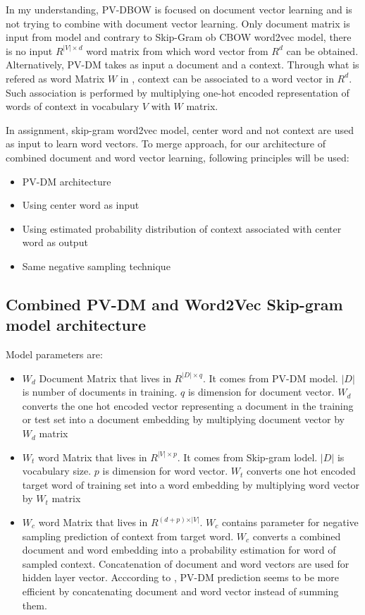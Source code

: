 \documentclass[a4paper]{article}
\begin{document}
In my understanding, PV-DBOW is focused on document vector learning and is not trying to combine with document vector learning. Only document matrix is input from model and contrary to Skip-Gram ob CBOW word2vec model, there is no input $R^{\vert V \vert \times d}$ word matrix from which word vector from $R^{d}$ can be obtained.\\

Alternatively, PV-DM takes as input a document and a context. Through what is refered as word Matrix $W$ in \cite{quocLe2014doc2vec}, context can be associated to a word vector in $R^{d}$. Such association is performed by multiplying one-hot encoded representation of words of context in vocabulary $V$ with $W$ matrix.

In assignment, skip-gram word2vec model, center word and not context are used as input to learn word vectors. To merge approach, for our architecture of combined document and word vector learning, following principles will be used:
\begin{itemize}
\item PV-DM architecture
\item Using center word as input
\item Using estimated probability distribution of context associated with center word as output
\item Same negative sampling technique
\end{itemize}


\subsection{Combined PV-DM and Word2Vec Skip-gram model architecture}

Model parameters are:

\begin{itemize}
\item $W_{d}$ Document Matrix that lives in $R^{\vert D \vert \times q }$. It comes from PV-DM model. $\vert D \vert$ is number of documents in training. $q$ is dimension for document vector. $W_{d}$ converts the one hot encoded vector representing a document in the training or test set into a document embedding by multiplying document vector by $W_{d}$ matrix
\item $W_{t}$ word Matrix that lives in $R^{\vert V \vert \times p }$. It comes from Skip-gram lodel. $\vert D \vert$ is vocabulary size. $p$ is dimension for word vector. $W_{t}$ converts one hot encoded target word of training set into a word embedding by multiplying word vector by $W_{t}$ matrix 
\item $W_{c}$ word Matrix that lives in $R^{(d + p) \times \vert V \vert }$. $W_{c}$ contains parameter for negative sampling prediction of context from target word. $W_{c}$ converts a combined document and word embedding into a probability estimation for word of sampled context. Concatenation of document and word vectors are used for hidden layer vector. Acccording to \cite{quocLe2014doc2vec}, PV-DM prediction seems to be more efficient by concatenating document and word vector instead of summing them.
\end{itemize}
\end{document}
